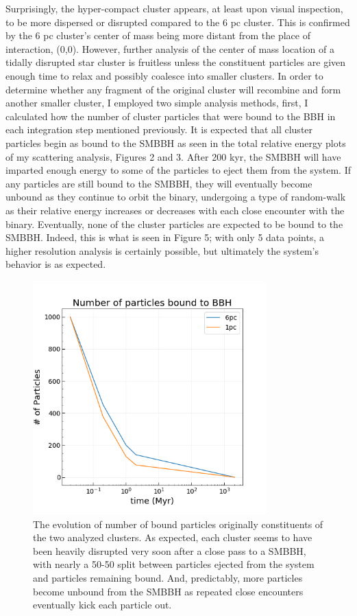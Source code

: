 \documentclass{aastex62}
\begin{document}
Surprisingly, the hyper-compact cluster appears, at least upon visual inspection, to be more dispersed or disrupted compared to the 6 pc cluster. This is confirmed by the 6 pc cluster's center of mass being more distant from the place of interaction, (0,0). However, further analysis of the center of mass location of a tidally disrupted star cluster is fruitless unless the constituent particles are given enough time to relax and possibly coalesce into smaller clusters. In order to determine whether any fragment of the original cluster will recombine and form another smaller cluster, I employed two simple analysis methods, first, I calculated how the number of cluster particles that were bound to the BBH in each integration step mentioned previously. It is expected that all cluster particles begin as bound to the SMBBH as seen in the total relative energy plots of my scattering analysis, Figures 2 and 3. After 200 kyr, the SMBBH will have imparted enough energy to some of the particles to eject them from the system. If any particles are still bound to the SMBBH, they will eventually become unbound as they continue to orbit the binary, undergoing a type of random-walk as their relative energy increases or decreases with each close encounter with the binary. Eventually, none of the cluster particles are expected to be bound to the SMBBH. Indeed, this is what is seen in Figure 5; with only 5 data points, a higher resolution analysis is certainly possible, but ultimately the system's behavior is as expected.
\begin{figure}
\includegraphics[width=9cm,height=9cm]{./Images/bound_particle_number.png}
\centering
\caption{The evolution of number of bound particles originally constituents of the two analyzed clusters. As expected, each cluster seems to have been heavily disrupted very soon after a close pass to a SMBBH, with nearly a 50-50 split between particles ejected from the system and particles remaining bound. And, predictably, more particles become unbound from the SMBBH as repeated close encounters eventually kick each particle out.}
\end{figure}
\end{document}
